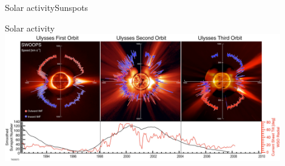 \begin{frame}[plain,c]{Solar activity}{Sunspots}
	\centering
\end{frame}
\begin{frame}[plain,c]{Solar activity}{}
	\includegraphics[width=0.9\textwidth]{../figures_of_others/images/McComas2008_Ulysses_orbit_.png}
\end{frame}

